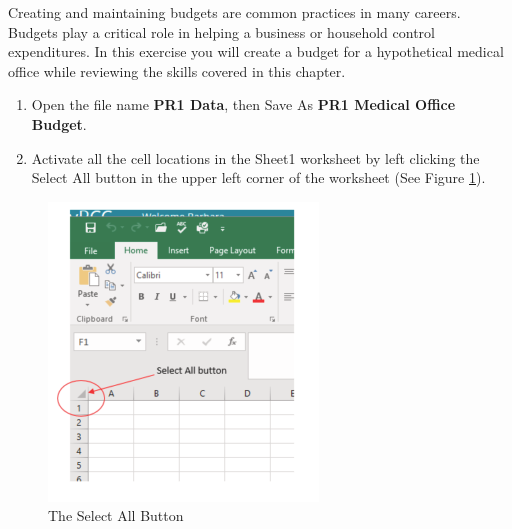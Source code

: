 Creating and maintaining budgets are common practices in many careers. Budgets play a critical role in helping a business or household control expenditures. In this exercise you will create a budget for a hypothetical medical office while reviewing the skills covered in this chapter.

\begin{enumerate}
	\item Open the file name \textbf{PR1 Data}, then Save As \textbf{PR1 Medical Office Budget}.
	\item Activate all the cell locations in the Sheet1 worksheet by left clicking the Select All button in the upper left corner of the worksheet (See Figure \ref{01:fig53}).
\end{enumerate}

\begin{figure}[H]
	\centering
	\includegraphics[width=\maxwidth{.95\linewidth}]{gfx/ch01_fig53}
	\caption{The Select All Button}
	\label{01:fig53}
\end{figure}


